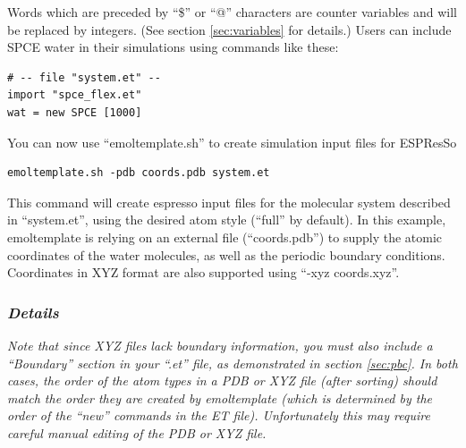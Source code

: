 \documentclass[11pt]{article}
\begin{document}
Words which are preceded by ``\$'' or ``@'' characters 
are counter variables and will be replaced by integers. 
(See section \ref{sec:variables} for details.)
Users can include SPCE water in their simulations using commands like these:
\begin{verbatim}
# -- file "system.et" --
import "spce_flex.et"
wat = new SPCE [1000]
\end{verbatim}
You can now use ``emoltemplate.sh'' to create simulation input files for ESPResSo
\begin{verbatim}
emoltemplate.sh -pdb coords.pdb system.et
\end{verbatim}
This command will create espresso input files 
for the molecular system described in ``system.et'',
using the desired atom style (``full'' by default).
In this example, emoltemplate is relying on an external file (``coords.pdb'')
to supply the atomic coordinates of the water molecules, as well as
the periodic boundary conditions.
Coordinates in XYZ format are also supported using ``-xyz coords.xyz''. 


\subsubsection*{\textit{Details}}
\textit{Note that since XYZ files lack boundary information, you must also 
 include a ``Boundary'' section in your ``.et'' file, as demonstrated 
 in section \ref{sec:pbc}. 
 In both cases, the order of the atom types in a PDB or XYZ file 
 (after sorting) should match the order they are created by emoltemplate
 (which is determined by the order of the ``new'' commands 
 in the ET file). 
 Unfortunately this may require careful manual editing of the PDB or XYZ file.}
\end{document}
